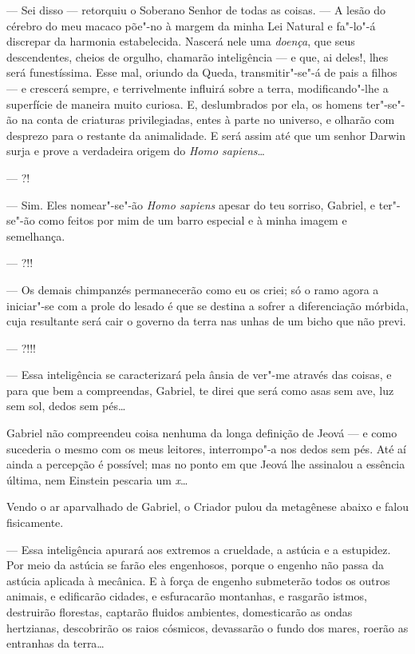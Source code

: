 --- Sei disso --- retorquiu o Soberano Senhor de todas as coisas. --- A
lesão do cérebro do meu macaco põe"-no à margem da minha Lei Natural e
fa"-lo"-á discrepar da harmonia estabelecida. Nascerá nele uma
\emph{doença}, que seus descendentes, cheios de orgulho, chamarão
inteligência --- e que, ai deles!, lhes será funestíssima. Esse mal,
oriundo da Queda, transmitir"-se"-á de pais a filhos --- e crescerá
sempre, e terrivelmente influirá sobre a terra, modificando"-lhe a
superfície de maneira muito curiosa. E, deslumbrados por ela, os homens
ter"-se"-ão na conta de criaturas privilegiadas, entes à parte no
universo, e olharão com desprezo para o restante da animalidade. E será
assim até que um senhor Darwin surja e prove a verdadeira origem do
\emph{Homo sapiens}\ldots{}

--- ?!

--- Sim. Eles nomear"-se"-ão \emph{Homo sapiens} apesar do teu sorriso,
Gabriel, e ter"-se"-ão como feitos por mim de um barro especial e à minha
imagem e semelhança.

--- ?!!

--- Os demais chimpanzés permanecerão como eu os criei; só o ramo agora
a iniciar"-se com a prole do lesado é que se destina a sofrer a
diferenciação mórbida, cuja resultante será cair o governo da terra nas
unhas de um bicho que não previ.

--- ?!!!

--- Essa inteligência se caracterizará pela ânsia de ver"-me através das
coisas, e para que bem a compreendas, Gabriel, te direi que será como
asas sem ave, luz sem sol, dedos sem pés\ldots{}

Gabriel não compreendeu coisa nenhuma da longa definição de Jeová --- e
como sucederia o mesmo com os meus leitores, interrompo"-a nos dedos sem
pés. Até aí ainda a percepção é possível; mas no ponto em que Jeová lhe
assinalou a essência última, nem Einstein pescaria um \emph{x}\ldots{}

Vendo o ar aparvalhado de Gabriel, o Criador pulou da metagênese abaixo
e falou fisicamente.

--- Essa inteligência apurará aos extremos a crueldade, a astúcia e a
estupidez. Por meio da astúcia se farão eles engenhosos, porque o
engenho não passa da astúcia aplicada à mecânica. E à força de engenho
submeterão todos os outros animais, e edificarão cidades, e esfuracarão
montanhas, e rasgarão istmos, destruirão florestas, captarão fluidos
ambientes, domesticarão as ondas hertzianas, descobrirão os raios
cósmicos, devassarão o fundo dos mares, roerão as entranhas da terra\ldots{}

